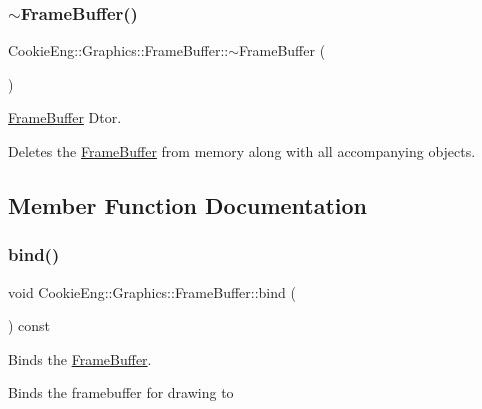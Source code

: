 \subsubsection{\texorpdfstring{$\sim$\+Frame\+Buffer()}{~FrameBuffer()}}
{\footnotesize\ttfamily Cookie\+Eng\+::\+Graphics\+::\+Frame\+Buffer\+::$\sim$\+Frame\+Buffer (\begin{DoxyParamCaption}{ }\end{DoxyParamCaption})}



\hyperlink{class_cookie_eng_1_1_graphics_1_1_frame_buffer}{Frame\+Buffer} Dtor. 

Deletes the \hyperlink{class_cookie_eng_1_1_graphics_1_1_frame_buffer}{Frame\+Buffer} from memory along with all accompanying objects. 

\subsection{Member Function Documentation}
\mbox{\label{class_cookie_eng_1_1_graphics_1_1_frame_buffer_ab2fb31d8a065cc53e95233a388fd2d09}} 
\subsubsection{\texorpdfstring{bind()}{bind()}}
{\footnotesize\ttfamily void Cookie\+Eng\+::\+Graphics\+::\+Frame\+Buffer\+::bind (\begin{DoxyParamCaption}{ }\end{DoxyParamCaption}) const}



Binds the \hyperlink{class_cookie_eng_1_1_graphics_1_1_frame_buffer}{Frame\+Buffer}. 

Binds the framebuffer for drawing to \mbox{\label{class_cookie_eng_1_1_graphics_1_1_frame_buffer_aa0b8e867cb21fee1d79d6f48026e7c0b}} 
